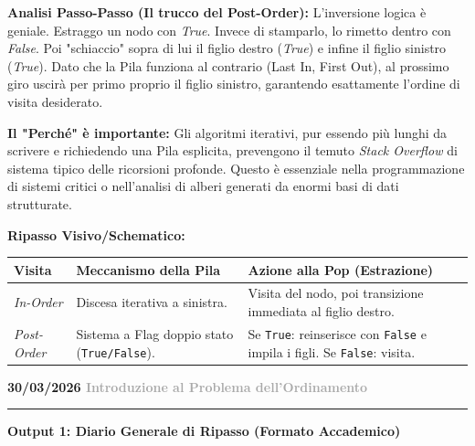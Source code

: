\documentclass[a4paper, 11pt]{report}
\newcommand{\lezione}[2]{
\vspace{2em}
\noindent\textbf{\Large #1 \hfill \textcolor{darkgray}{#2}}
\vspace{0.5em}
\hrule
\vspace{1.5em}
}
\begin{document}
\textbf{Analisi Passo-Passo (Il trucco del Post-Order):}
L'inversione logica è geniale. Estraggo un nodo con \textit{True}. Invece di stamparlo, lo rimetto dentro con \textit{False}. Poi "schiaccio" sopra di lui il figlio destro (\textit{True}) e infine il figlio sinistro (\textit{True}). Dato che la Pila funziona al contrario (Last In, First Out), al prossimo giro uscirà per primo proprio il figlio sinistro, garantendo esattamente l'ordine di visita desiderato.

\textbf{Il "Perché" è importante:}
Gli algoritmi iterativi, pur essendo più lunghi da scrivere e richiedendo una Pila esplicita, prevengono il temuto \textit{Stack Overflow} di sistema tipico delle ricorsioni profonde. Questo è essenziale nella programmazione di sistemi critici o nell'analisi di alberi generati da enormi basi di dati strutturate.

\textbf{Ripasso Visivo/Schematico:}
\begin{center}
\begin{tabular}{|l|p{5cm}|p{6cm}|}
\hline
\textbf{Visita} & \textbf{Meccanismo della Pila} & \textbf{Azione alla Pop (Estrazione)} \\
\hline
\textit{In-Order} & Discesa iterativa a sinistra. & Visita del nodo, poi transizione immediata al figlio destro. \\
\hline
\textit{Post-Order} & Sistema a Flag doppio stato (\texttt{True/False}). & Se \texttt{True}: reinserisce con \texttt{False} e impila i figli. Se \texttt{False}: visita. \\
\hline
\end{tabular}
\end{center}


\lezione{30/03/2026}{Introduzione al Problema dell'Ordinamento}

\vspace{0.5cm}
\textbf{Output 1: Diario Generale di Ripasso (Formato Accademico)}
\end{document}
